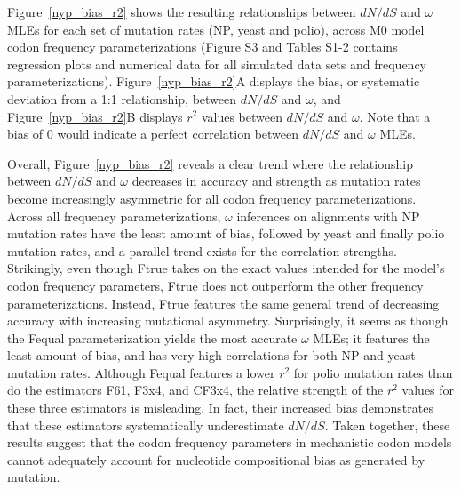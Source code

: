 \documentclass{pnastwo}
\begin{document}
\begin{article}
Figure~\ref{nyp_bias_r2} shows the resulting relationships between $dN/dS$ and $\omega$ MLEs for each set of mutation rates (NP, yeast and polio), across M0 model codon frequency parameterizations (Figure S3 and Tables S1-2 contains regression plots and numerical data for all simulated data sets and frequency parameterizations). Figure~\ref{nyp_bias_r2}A displays the bias, or systematic deviation from a 1:1 relationship, between $dN/dS$ and $\omega$, and Figure~\ref{nyp_bias_r2}B displays $r^2$ values between $dN/dS$ and $\omega$. Note that a bias of 0 would indicate a perfect correlation between $dN/dS$ and $\omega$ MLEs. 

Overall, Figure~\ref{nyp_bias_r2} reveals a clear trend where the relationship between $dN/dS$ and $\omega$ decreases in accuracy and strength as mutation rates become increasingly asymmetric for all codon frequency parameterizations. Across all frequency parameterizations, $\omega$ inferences on alignments with NP mutation rates have the least amount of bias, followed by yeast and finally polio mutation rates, and a parallel trend exists for the correlation strengths. Strikingly, even though Ftrue  takes on the exact values intended for the model's codon frequency parameters, Ftrue does not outperform the other frequency parameterizations. Instead, Ftrue features the same general trend of decreasing accuracy with increasing mutational asymmetry. Surprisingly, it seems as though the Fequal parameterization yields the most accurate $\omega$ MLEs; it features the least amount of bias, and has very high correlations for both NP and yeast mutation rates. Although Fequal features a lower $r^2$ for polio mutation rates than do the estimators F61, F3x4, and CF3x4, the relative strength of the $r^2 $ values for these three estimators is misleading. In fact, their increased bias demonstrates that these estimators systematically underestimate $dN/dS$. Taken together, these results suggest that the codon frequency parameters in mechanistic codon models cannot adequately account for nucleotide compositional bias as generated by mutation. 


\end{article}
\end{document}
